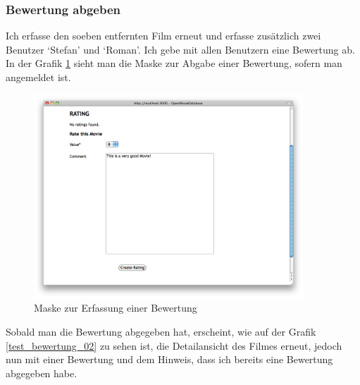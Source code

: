 \clearpage

\subsubsection{Bewertung abgeben}
Ich erfasse den soeben entfernten Film erneut und erfasse zusätzlich zwei Benutzer
`Stefan' und `Roman'. Ich gebe mit allen Benutzern eine Bewertung ab. In der Grafik
\ref{test_bewertung_01} sieht man die Maske zur Abgabe einer Bewertung, sofern man
angemeldet ist.

\begin{figure}[ht]
    \begin{center}
        \includegraphics[width=0.9\textwidth,angle=0]{./bilder/tests/test_bewertung_01.png}
        \caption{Maske zur Erfassung einer Bewertung}
        \label{test_bewertung_01}
    \end{center}
\end{figure}

Sobald man die Bewertung abgegeben hat, erscheint, wie auf der Grafik \ref{test_bewertung_02}
zu sehen ist, die Detailansicht des Filmes erneut, jedoch nun mit einer Bewertung
und dem Hinweis, dass ich bereits eine Bewertung abgegeben habe.

